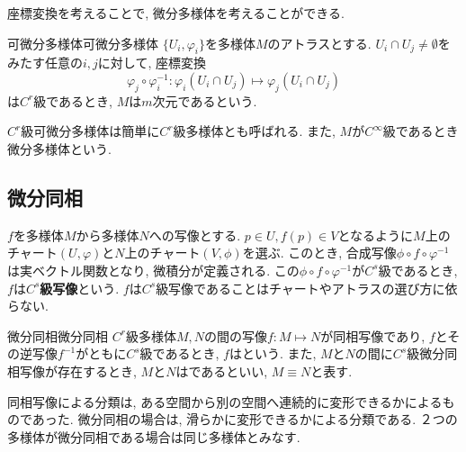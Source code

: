 \documentclass[../main.tex]{subfiles}
\begin{document}
        座標変換を考えることで, 微分多様体を考えることができる.
        \begin{dfn}{可微分多様体}{可微分多様体}
            $\{U_i,\varphi_i\}$を多様体$M$のアトラスとする. $U_i \cap U_j \ne \emptyset$をみたす任意の$i,j$に対して, 座標変換
            \begin{equation}
                \varphi_j\circ\varphi_i^{-1}: \varphi_i(U_i \cap U_j) \mapsto \varphi_j(U_i \cap U_j)
            \end{equation}
            は$C^r$級であるとき, $M$は$m$次元であるという.
        \end{dfn}
        $C^r$級可微分多様体は簡単に$C^r$級多様体とも呼ばれる.
        また, $M$が$C^\infty$級であるとき微分多様体という.

    \subsection{微分同相}
        $f$を多様体$M$から多様体$N$への写像とする. $p \in U,f(p) \in V$となるように$M$上のチャート$(U,\varphi)$と$N$上のチャート$(V,\phi)$を選ぶ. このとき, 合成写像$\phi \circ f \circ \varphi^{-1}$は実ベクトル関数となり, 微積分が定義される. この$\phi \circ f \circ \varphi^{-1}$が$C^s$級であるとき, $f$は\textbf{$C^s$級写像}という. $f$は$C^s$級写像であることはチャートやアトラスの選び方に依らない.
        \begin{dfn}{微分同相}{微分同相}
            $C^r$級多様体$M,N$の間の写像$f:M \mapsto N$が同相写像であり, $f$とその逆写像$f^{-1}$がともに$C^s$級であるとき, $f$はという. また, $M$と$N$の間に$C^s$級微分同相写像が存在するとき, $M$と$N$はであるといい, $M \equiv N$と表す.
        \end{dfn}
        同相写像による分類は, ある空間から別の空間へ連続的に変形できるかによるものであった. 微分同相の場合は, 滑らかに変形できるかによる分類である. ２つの多様体が微分同相である場合は同じ多様体とみなす.
\end{document}
